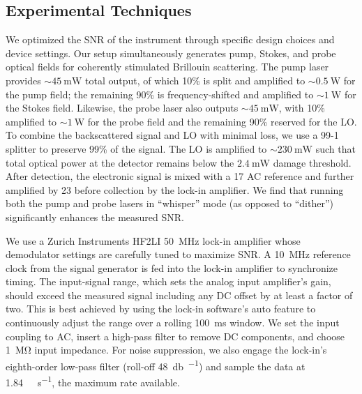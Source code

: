 \subsection{Experimental Techniques}
\label{Methods:Experimental Techniques}
We optimized the \ac{SNR} of the instrument through specific design choices and device settings. Our setup simultaneously generates pump, Stokes, and probe optical fields for coherently stimulated Brillouin scattering. The pump laser provides \(\sim\!\SI{45}{\milli\watt}\) total output, of which 10\% is split and amplified to \(\sim\!\SI{0.5}{\watt}\) for the pump field; the remaining 90\% is frequency-shifted and amplified to \(\sim\!\SI{1}{\watt}\) for the Stokes field. Likewise, the probe laser also outputs \(\sim\!\SI{45}{\milli\watt}\), with 10\% amplified to \(\sim\!\SI{1}{\watt}\) for the probe field and the remaining 90\% reserved for the \ac{LO}. To combine the backscattered signal and \ac{LO} with minimal loss, we use a 99-1 splitter to preserve 99\% of the signal. The \ac{LO} is amplified to \(\sim\!\SI{230}{\milli\watt}\) such that total optical power at the detector remains below the \(\SI{2.4}{\milli\watt}\) damage threshold. After detection, the electronic signal is mixed with a \SI{17}{\dBm} \ac{AC} reference and further amplified by \SI{23}{\dBm} before collection by the lock-in amplifier. We find that running both the pump and probe lasers in ``whisper'' mode (as opposed to ``dither'') significantly enhances the measured SNR.

We use a Zurich Instruments HF2LI \SI{50}{\mega\hertz} lock-in amplifier whose demodulator settings are carefully tuned to maximize \ac{SNR}. A \SI{10}{\mega\hertz} reference clock from the signal generator is fed into the lock-in amplifier to synchronize timing. The input-signal range, which sets the analog input amplifier’s gain, should exceed the measured signal including any \ac{DC} offset by at least a factor of two. This is best achieved by using the lock-in software’s auto feature to continuously adjust the range over a rolling \SI{100}{\milli\second} window. We set the input coupling to \ac{AC}, insert a high-pass filter to remove \ac{DC} components, and choose \SI{1}{\mega\ohm} input impedance. For noise suppression, we also engage the lock-in’s eighth-order low-pass filter (roll-off \SI{48}{\decibel\per\octave}) and sample the data at \SI{1.84}{\mega\sample\per\second}, the maximum rate available.

